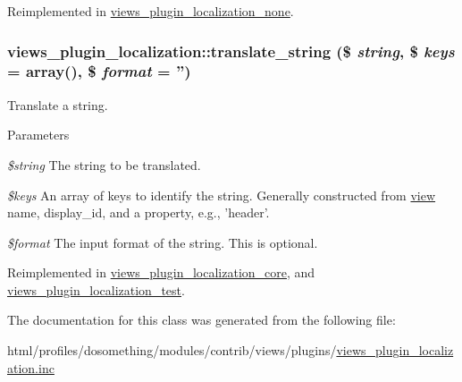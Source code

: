 Reimplemented in \hyperlink{classviews__plugin__localization__none_a2fcd5143ca56317256a13291e91c6c89}{views\_\-plugin\_\-localization\_\-none}.\hypertarget{classviews__plugin__localization_a5c8353f0c80d4cf160e36133316f0a59}{
\subsubsection[{translate\_\-string}]{\setlength{\rightskip}{0pt plus 5cm}views\_\-plugin\_\-localization::translate\_\-string (\$ {\em string}, \/  \$ {\em keys} = {\ttfamily array()}, \/  \$ {\em format} = {\ttfamily ''})}}
\label{classviews__plugin__localization_a5c8353f0c80d4cf160e36133316f0a59}
Translate a string.


\begin{DoxyParams}{Parameters}
\item[{\em \$string}]The string to be translated. \item[{\em \$keys}]An array of keys to identify the string. Generally constructed from \hyperlink{classview}{view} name, display\_\-id, and a property, e.g., 'header'. \item[{\em \$format}]The input format of the string. This is optional. \end{DoxyParams}


Reimplemented in \hyperlink{classviews__plugin__localization__core_a01ca45e9578f631df900513ecceb1616}{views\_\-plugin\_\-localization\_\-core}, and \hyperlink{classviews__plugin__localization__test_a0b8d7823ac389e461a0cbe95488254d5}{views\_\-plugin\_\-localization\_\-test}.

The documentation for this class was generated from the following file:\begin{DoxyCompactItemize}
\item 
html/profiles/dosomething/modules/contrib/views/plugins/\hyperlink{views__plugin__localization_8inc}{views\_\-plugin\_\-localization.inc}\end{DoxyCompactItemize}
